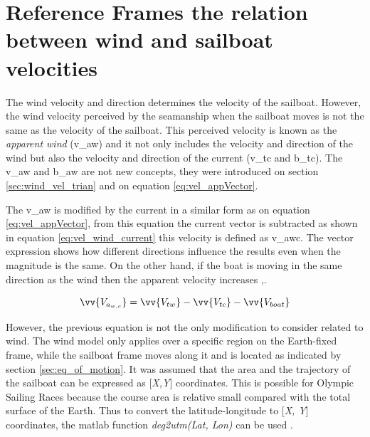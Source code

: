 \section{Reference Frames the relation between wind and sailboat velocities}

The wind velocity and direction determines the velocity of the sailboat. However, the wind velocity perceived by the seamanship when the sailboat moves is not the same as the velocity of the sailboat. This perceived velocity is known as the \textit{apparent wind} (\acrshort{v_aw}) and it not only includes the velocity and direction of the wind but also the velocity and direction of the current (\acrshort{v_tc} and \acrshort{b_tc}). The \acrshort{v_aw} and \acrshort{b_aw} are not new concepts, they were introduced on section \ref{sec:wind_vel_trian} and on equation \ref{eq:vel_appVector}. \par

The \acrshort{v_aw} is modified by the current in a similar form as on equation \ref{eq:vel_appVector}, from this equation the current vector is subtracted as shown in equation \ref{eq:vel_wind_current} this velocity is defined as \acrshort{v_awc}. The vector expression shows how different directions influence the results even when the magnitude is the same. On the other hand, if the boat is moving in the same direction as the wind then the apparent velocity increases \cite{denny2009float},\cite{allsopp1998stochastic}. \par 

\begin{equation} \label{eq:vel_wind_current}
\vv{V_{a_{w,c}}}= \vv{V_{tw}} -\vv{V_{tc}} - \vv{V_{boat}}
\end{equation}

However, the previous equation is not the only modification to consider related to wind. %
The wind model only applies over a specific region on the Earth-fixed frame, while the sailboat frame moves along it and is located as indicated by section \ref{sec:eq_of_motion}. It was assumed that the area and the trajectory of the sailboat can be expressed as [\textit{X,Y}] coordinates. This is possible for Olympic Sailing Races because the course area is relative small compared with the total surface of the Earth. Thus to convert the latitude-longitude to [\textit{X, Y}] coordinates, the \acrshort{matlab} function \textit{deg2utm(Lat, Lon)} can be used \cite{allsopp1998stochastic}.\par \noindent 

